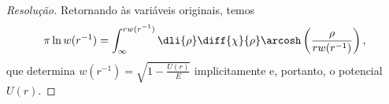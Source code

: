 \begin{proof}[Resolução]
    Retornando às variáveis originais, temos
    \begin{equation*}
        \pi \ln w(r^{-1}) = \int_{\infty}^{rw(r^{-1})} \dli{\rho} \diff{\chi}{\rho} \arcosh\left(\frac{\rho}{rw(r^{-1})}\right),
    \end{equation*}
    que determina \(w(r^{-1}) = \sqrt{1 - \frac{U(r)}{E}}\) implicitamente e, portanto, o potencial \(U(r)\). \todo[Mostrar que podemos escrever
    \begin{equation*}
        w(r^{-1}) = \exp\left(\frac1\pi\int^\infty_{rw^{-1}} \dli{\rho} \frac{\chi(\rho)}{\sqrt{\rho^2 - r^2w^2(r^{-1})}}\right),
    \end{equation*}
    como o Landau diz.]
\end{proof}
